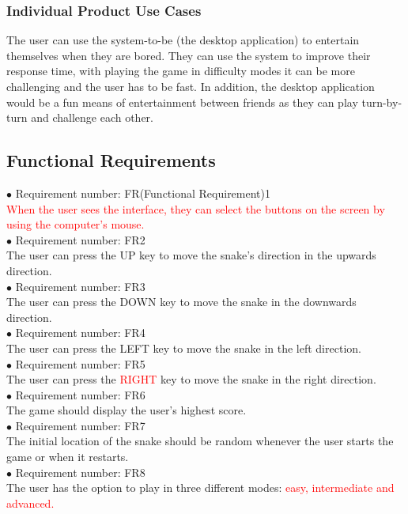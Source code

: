 \documentclass[12pt, titlepage]{article}
\begin{document}
\subsubsection{Individual Product Use Cases}
%
The user can use the system-to-be (the desktop application) to entertain themselves when they are bored. They can use the system to improve their response time, with playing the game in difficulty modes it can be more challenging and the user has to be fast. In addition, the desktop application would be a fun means of entertainment between friends as they can play turn-by-turn and challenge each other.
\subsection{Functional Requirements}


$\bullet$ Requirement number: FR(Functional Requirement)1\\
\textcolor{red}{When the user sees the interface, they can select the buttons on the screen by using the computer's mouse.}\\

$\bullet$ Requirement number: FR2\\
The user can press the UP key to move the snake's direction in the upwards direction.\\

$\bullet$ Requirement number: FR3\\
The user can press the DOWN key to move the snake in the downwards direction.\\

$\bullet$ Requirement number: FR4\\
The user can press the LEFT key to move the snake in the left direction.\\

$\bullet$ Requirement number: FR5\\
The user can press the \textcolor{red}{RIGHT} key to move the snake in the right direction.\\

$\bullet$ Requirement number: FR6\\
The game should display the user's highest score.\\

$\bullet$ Requirement number: FR7\\
The initial location of the snake should be random whenever the user starts the game or when it restarts.\\

$\bullet$ Requirement number: FR8\\
The user has the option to play in three different modes: \textcolor{red}{easy, intermediate and advanced.}\\
\end{document}
